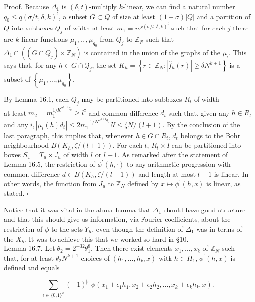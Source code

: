 \documentclass[10pt]{article}
\begin{document}
Proof. Because $\Delta_{1}$ is $(\delta, t)$-multiply $k$-linear, we can find a natural number $q_{0}\leqslant q(\sigma / t, \delta, k)^{t}$, a subset $G \subset Q$ of size at least $(1-\sigma)|Q|$ and a partition of $Q$ into subboxes $Q_{j}$ of width at least $m_{1}=m^{c(\sigma / t, \delta, k)^{t}}$ such that for each $j$ there are $k$-linear functions $\mu_{1}, \ldots, \mu_{q_{0}}$ from $Q_{j}$ to $\mathbb{Z}_{N}$ such that $\Delta_{1} \cap\left(\left(G \cap Q_{j}\right) \times \mathbb{Z}_{N}\right)$ is contained in the union of the graphs of the $\mu_{i}$. This says that, for any $h \in G \cap Q_{j}$, the set $K_{h}=\left\{r \in \mathbb{Z}_{N}:\left|\hat{f}_{h}(r)\right| \geqslant \delta N^{k+1}\right\}$ is a subset of $\left\{\mu_{1}, \ldots, \mu_{q_{0}}\right\}$.

By Lemma 16.1, each $Q_{j}$ may be partitioned into subboxes $R_{t}$ of width\\
at least $m_{2}=m_{1}^{1 / K^{2^{k+1} q_{0}}} \geqslant l^{2}$ and common difference $d_{t}$ such that, given any $h \in R_{t}$ and any $i,\left|\mu_{i}(h) d_{t}\right| \leqslant 2 m_{1}^{-1 / K^{2^{k+1} q_{0}}} N \leqslant \zeta N /(l+1)$. By the conclusion of the last paragraph, this implies that, whenever $h \in G \cap R_{t}$, $d_{t}$ belongs to the Bohr neighbourhood $B\left(K_{h}, \zeta /(l+1)\right)$. For each $t$, $R_{t} \times I$ can be partitioned into boxes $S_{u}=T_{u} \times J_{u}$ of width $l$ or $l+1$. As remarked after the statement of Lemma 16.5, the restriction of $\phi^{\prime}(h,\mathord\cdot)$ to any arithmetic progression with common difference $d \in B\left(K_{h}, \zeta /(l+1)\right)$ and length at most $l+1$ is linear. In other words, the function from $J_{u}$ to $\mathbb{Z}_{N}$ defined by $x \mapsto \phi^{\prime}(h, x)$ is linear, as stated. \(\square\)

Notice that it was vital in the above lemma that $\Delta_{1}$ should have good structure and that this should give us information, via Fourier coefficients, about the restriction of $\phi$ to the sets $Y_{h}$, even though the definition of $\Delta_{1}$ was in terms of the $X_{h}$. It was to achieve this that we worked so hard in §10.\\
Lemma 16.7. Let $\theta_{2}=2^{-32} \theta_{1}^{8}$. Then there exist elements $x_{1}, \ldots, x_{k}$ of $\mathbb{Z}_{N}$ such that, for at least $\theta_{2} N^{k+1}$ choices of $\left(h_{1}, \ldots, h_{k}, x\right)$ with $h \in H_{1}$, $\phi^{\prime}(h, x)$ is defined and equals

$$
\sum_{\epsilon \in\{0,1\}^{k}}(-1)^{|\epsilon|} \phi\left(x_{1}+\epsilon_{1} h_{1}, x_{2}+\epsilon_{2} h_{2}, \ldots, x_{k}+\epsilon_{k} h_{k}, x\right) .
$$
\end{document}

